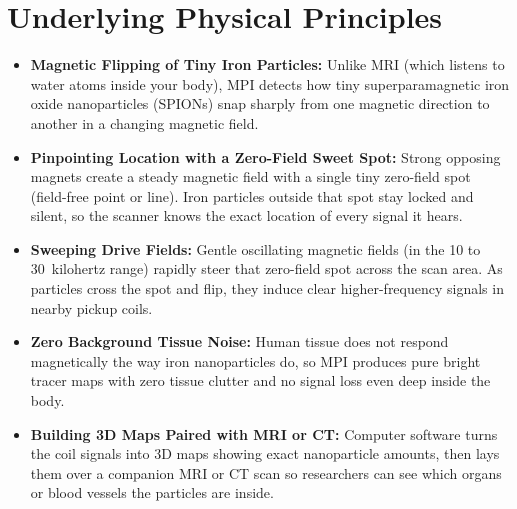 \section{Underlying Physical Principles}
\begin{itemize}
  \item \textbf{Magnetic Flipping of Tiny Iron Particles:} Unlike MRI (which listens to water atoms inside your body), MPI detects how tiny superparamagnetic iron oxide nanoparticles (SPIONs) snap sharply from one magnetic direction to another in a changing magnetic field.
  \item \textbf{Pinpointing Location with a Zero-Field Sweet Spot:} Strong opposing magnets create a steady magnetic field with a single tiny zero-field spot (field-free point or line). Iron particles outside that spot stay locked and silent, so the scanner knows the exact location of every signal it hears.
  \item \textbf{Sweeping Drive Fields:} Gentle oscillating magnetic fields (in the 10 to 30~kilohertz range) rapidly steer that zero-field spot across the scan area. As particles cross the spot and flip, they induce clear higher-frequency signals in nearby pickup coils.
  \item \textbf{Zero Background Tissue Noise:} Human tissue does not respond magnetically the way iron nanoparticles do, so MPI produces pure bright tracer maps with zero tissue clutter and no signal loss even deep inside the body.
  \item \textbf{Building 3D Maps Paired with MRI or CT:} Computer software turns the coil signals into 3D maps showing exact nanoparticle amounts, then lays them over a companion MRI or CT scan so researchers can see which organs or blood vessels the particles are inside.
\end{itemize}

